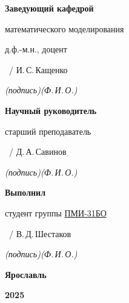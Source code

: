 \begin{titlepage}
\begingroup\small
\noindent\begin{minipage}[t]{0.48\linewidth}
\textbf{Заведующий кафедрой}\par
математического моделирования\par\vspace{0.2em}
д.ф.-м.н., доцент\par\vspace{0.6em}
\underline{\hspace{2.9cm}}\ / И.\,С.\,Кащенко\par
\emph{(подпись)\hfill(Ф.\,И.\,О.)}%
\end{minipage}\hfill
\begin{minipage}[t]{0.48\linewidth}\raggedleft
\textbf{Научный руководитель}\par\vspace{0.2em}
старший преподаватель\par\vspace{0.6em}
\underline{\hspace{2.9cm}}\ / Д.\,А.\,Савинов\par
\emph{(подпись)\hfill(Ф.\,И.\,О.)}\par\vspace{1em}

\textbf{Выполнил}\par\vspace{0.2em}
студент группы \ul{ПМИ-31БО}\par\vspace{0.6em}
\underline{\hspace{2.9cm}}\ / В.\,Д.\,Шестаков\par
\emph{(подпись)\hfill(Ф.\,И.\,О.)}%
\end{minipage}
\endgroup

\vspace{1.5cm}

\textbf{Ярославль}\par\vspace{0.25em}
\textbf{2025}
\end{titlepage}
